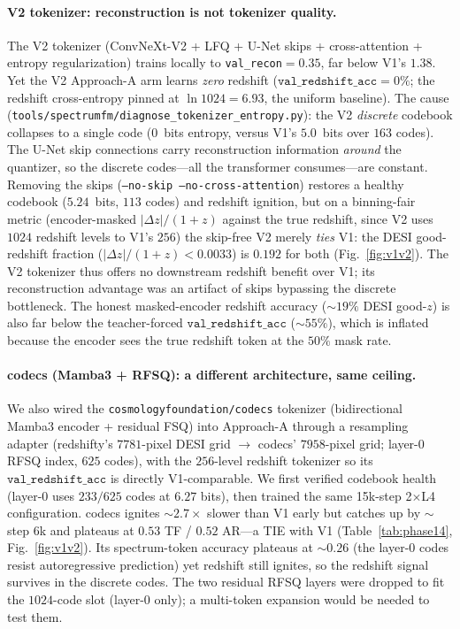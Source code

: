 \documentclass[11pt,letterpaper]{article}
\newcommand{\valz}{\texttt{val\_redshift\_acc}}
\begin{document}
\paragraph{V2 tokenizer: reconstruction is not tokenizer quality.}
The V2 tokenizer (ConvNeXt-V2 + LFQ + U-Net skips + cross-attention +
entropy regularization) trains locally to \texttt{val\_recon}${=}0.35$,
far below V1's $1.38$. Yet the V2 Approach-A arm learns \emph{zero}
redshift ($\valz{=}0\%$; the redshift cross-entropy pinned at
$\ln 1024 = 6.93$, the uniform baseline). The cause
(\texttt{tools/spectrumfm/diagnose\_tokenizer\_entropy.py}): the V2
\emph{discrete} codebook collapses to a single code ($0$~bits entropy,
versus V1's $5.0$~bits over $163$ codes). The U-Net skip connections
carry reconstruction information \emph{around} the quantizer, so the
discrete codes---all the transformer consumes---are constant. Removing
the skips (\texttt{--no-skip --no-cross-attention}) restores a healthy
codebook ($5.24$~bits, $113$ codes) and redshift ignition, but on a
binning-fair metric (encoder-masked $|\Delta z|/(1{+}z)$ against the true
redshift, since V2 uses $1024$ redshift levels to V1's $256$) the
skip-free V2 merely \emph{ties} V1: the DESI good-redshift fraction
($|\Delta z|/(1{+}z) < 0.0033$) is $0.192$ for both
(Fig.~\ref{fig:v1v2}). The V2 tokenizer thus offers no downstream
redshift benefit over V1; its reconstruction advantage was an artifact
of skips bypassing the discrete bottleneck. The honest masked-encoder
redshift accuracy (${\sim}19\%$ DESI good-$z$) is also far below the
teacher-forced $\valz$ (${\sim}55\%$), which is inflated because the
encoder sees the true redshift token at the $50\%$ mask rate.

\paragraph{codecs (Mamba3 + RFSQ): a different architecture, same ceiling.}
We also wired the \texttt{cosmologyfoundation/codecs} tokenizer (bidirectional
Mamba3 encoder + residual FSQ) into Approach-A through a resampling adapter
(redshifty's $7781$-pixel DESI grid $\to$ codecs' $7958$-pixel grid; layer-0
RFSQ index, $625$ codes), with the $256$-level redshift tokenizer so its $\valz$
is directly V1-comparable. We first verified codebook health (layer-0 uses
$233/625$ codes at $6.27$ bits), then trained the same 15k-step 2$\times$L4
configuration. codecs ignites ${\sim}2.7\times$ slower than V1 early but catches
up by ${\sim}$step $6$k and plateaus at $0.53$ TF / $0.52$ AR---a TIE with V1
(Table~\ref{tab:phase14}, Fig.~\ref{fig:v1v2}). Its spectrum-token accuracy
plateaus at ${\sim}0.26$ (the layer-0 codes resist autoregressive prediction)
yet redshift still ignites, so the redshift signal survives in the discrete
codes. The two residual RFSQ layers were dropped to fit the $1024$-code slot
(layer-0 only); a multi-token expansion would be needed to test them.
\end{document}
